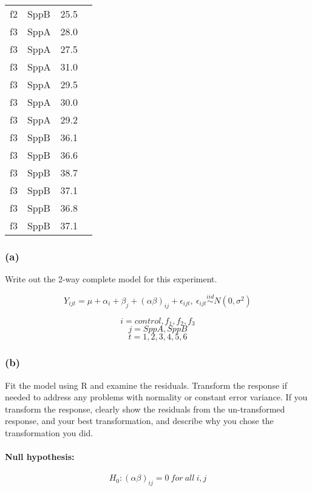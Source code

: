\documentclass[11pt]{article}
\begin{document}
\begin{tabular}{|r|l|l|l|}
	 f2      & SppB    & 25.5   \\
	 f3      & SppA    & 28.0   \\
	 f3      & SppA    & 27.5   \\
	 f3      & SppA    & 31.0   \\
	 f3      & SppA    & 29.5   \\
	 f3      & SppA    & 30.0   \\
	 f3      & SppA    & 29.2   \\
	 f3      & SppB    & 36.1   \\
	 f3      & SppB    & 36.6   \\
	 f3      & SppB    & 38.7   \\
	 f3      & SppB    & 37.1   \\
	 f3      & SppB    & 36.8   \\
	 f3      & SppB    & 37.1   \\
\end{tabular}


    
    \subsubsection*{(a)}\label{a}

Write out the 2-way complete model for this experiment.

\[Y_{ijt} = \mu + \alpha_i + \beta_j + (\alpha \beta)_{ij} + \epsilon_{ijt}, \: \epsilon_{ijt}
\stackrel{iid}{\sim} N(0, \sigma^2)\]

\[i = control, f_1, f_2, f_3\] \[j = SppA, SppB\]
\[t = 1, 2, 3, 4, 5, 6\]

    \subsubsection*{(b)}\label{b}

Fit the model using R and examine the residuals. Transform the response
if needed to address any problems with normality or constant error
variance. If you transform the response, clearly show the residuals from
the un-transformed response, and your best transformation, and describe
why you chose the transformation you did.

    \paragraph{Null hypothesis:}\label{null-hypothesis}

\[H_0 : (\alpha \beta)_{ij} = 0 \: for \: all \: i, j\]
\end{document}
